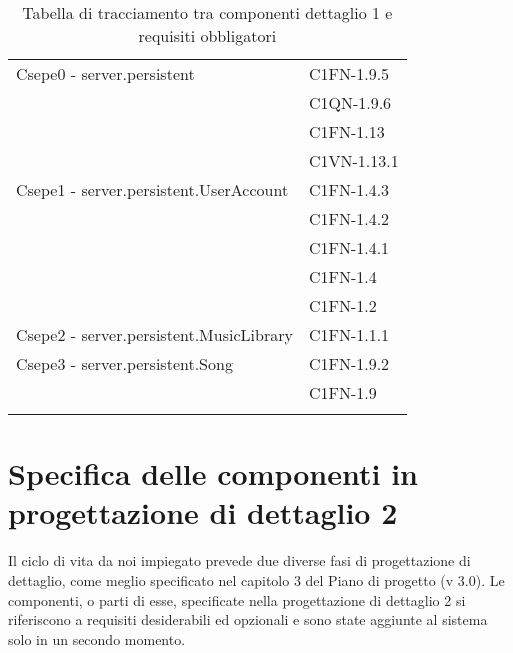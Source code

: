\begin{footnotesize}
\begin{longtable}[!h]{|l|l|}
Csepe0 - server.persistent & C1FN-1.9.5 \\
& C1QN-1.9.6 \\
& C1FN-1.13 \\
& C1VN-1.13.1 \\\hline
Csepe1 - server.persistent.UserAccount & C1FN-1.4.3 \\
& C1FN-1.4.2 \\
& C1FN-1.4.1 \\
& C1FN-1.4 \\
& C1FN-1.2 \\\hline
Csepe2 - server.persistent.MusicLibrary &  C1FN-1.1.1 \\\hline
Csepe3 - server.persistent.Song & C1FN-1.9.2 \\
& C1FN-1.9 \\\hline
\caption{Tabella di tracciamento tra componenti dettaglio 1 e requisiti
obbligatori}
\end{longtable}
\end{footnotesize}

\chapter{Specifica delle componenti in progettazione di dettaglio 2}
\thispagestyle{fancy} %
Il ciclo di vita da noi impiegato prevede due diverse fasi di progettazione di
dettaglio, come meglio specificato nel capitolo 3 del Piano di progetto (v
3.0). Le componenti, o parti di esse, specificate nella progettazione di
dettaglio 2 si riferiscono a requisiti desiderabili ed opzionali e sono state
aggiunte al sistema solo in un secondo momento. 
